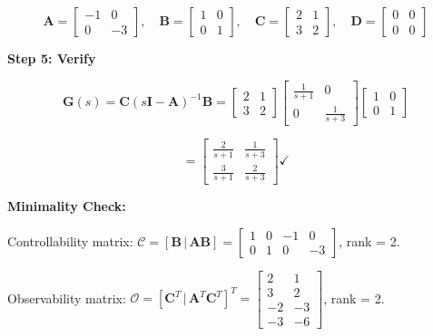 \begin{equation}
\mathbf{A} = \begin{bmatrix} -1 & 0 \\ 0 & -3 \end{bmatrix}, \quad
\mathbf{B} = \begin{bmatrix} 1 & 0 \\ 0 & 1 \end{bmatrix}, \quad
\mathbf{C} = \begin{bmatrix} 2 & 1 \\ 3 & 2 \end{bmatrix}, \quad
\mathbf{D} = \begin{bmatrix} 0 & 0 \\ 0 & 0 \end{bmatrix}
\end{equation}

\textbf{Step 5: Verify}

\begin{equation}
\mathbf{G}(s) = \mathbf{C}(s\mathbf{I} - \mathbf{A})^{-1}\mathbf{B} = \begin{bmatrix} 2 & 1 \\ 3 & 2 \end{bmatrix} \begin{bmatrix} \frac{1}{s+1} & 0 \\ 0 & \frac{1}{s+3} \end{bmatrix} \begin{bmatrix} 1 & 0 \\ 0 & 1 \end{bmatrix}
\end{equation}

\begin{equation}
= \begin{bmatrix} \frac{2}{s+1} & \frac{1}{s+3} \\ \frac{3}{s+1} & \frac{2}{s+3} \end{bmatrix} \checkmark
\end{equation}

\textbf{Minimality Check:}

Controllability matrix: $\mathcal{C} = [\mathbf{B} \,|\, \mathbf{A}\mathbf{B}] = \begin{bmatrix} 1 & 0 & -1 & 0 \\ 0 & 1 & 0 & -3 \end{bmatrix}$, rank = 2.

Observability matrix: $\mathcal{O} = [\mathbf{C}^T \,|\, \mathbf{A}^T\mathbf{C}^T]^T = \begin{bmatrix} 2 & 1 \\ 3 & 2 \\ -2 & -3 \\ -3 & -6 \end{bmatrix}$, rank = 2.

